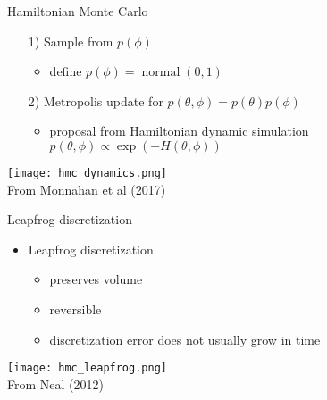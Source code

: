 \documentclass[finnish,english,t]{beamer}
\DeclareMathOperator{\normal}{normal}
\begin{document}
\begin{frame}{Hamiltonian Monte Carlo}

  \begin{itemize}
  \item[1)] Sample from $p(\phi)$
    \begin{itemize}
    \item define $p(\phi) = \normal(0,1)$
    \end{itemize}
  \item[2)] Metropolis update for $p(\theta,\phi)=p(\theta)p(\phi)$
    \begin{itemize}
    \item proposal from Hamiltonian dynamic simulation $p(\theta,\phi) \propto \exp(-H(\theta,\phi))$
    \end{itemize}
  
  \end{itemize}
  \vspace{16.5pt}
  \texttt{[image: hmc\_dynamics.png]}\\
  {\footnotesize From Monnahan et al (2017)}
  
\end{frame}

\begin{frame}{Leapfrog discretization}

  \begin{itemize}
  \item Leapfrog discretization
    \begin{itemize}
    \item preserves volume
    \item reversible
    \item discretization error does not usually grow in time
    \end{itemize}
  \end{itemize}
  \vspace{4.3pt}
  {\texttt{[image: hmc\_leapfrog.png]}}
  \\
  {\footnotesize From Neal (2012)}
  
\end{frame}
\end{document}
